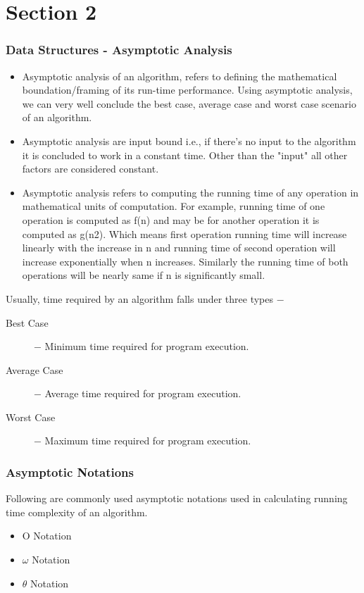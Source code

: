 \documentclass{beamer}
\begin{document}
\section{Section 2}
\begin{frame}
\frametitle{Data Structures - Asymptotic Analysis}
 
 \begin{itemize}
\item Asymptotic analysis of an algorithm, refers to defining the mathematical boundation/framing of its run-time performance. Using asymptotic analysis, we can very well conclude the best case, average case and worst case scenario of an algorithm.
\item 
Asymptotic analysis are input bound i.e., if there's no input to the algorithm it is concluded to work in a constant time. Other than the "input" all other factors are considered constant.
\item 
Asymptotic analysis refers to computing the running time of any operation in mathematical units of computation. For example, running time of one operation is computed as f(n) and may be for another operation it is computed as g(n2). Which means first operation running time will increase linearly with the increase in n and running time of second operation will increase exponentially when n increases. Similarly the running time of both operations will be nearly same if n is significantly small.
\end{itemize}
\end{frame}
\begin{frame}

Usually, time required by an algorithm falls under three types −
\begin{description}
\item[Best Case] − Minimum time required for program execution.

\item[Average Case] − Average time required for program execution.

\item[Worst Case] − Maximum time required for program execution.
\end{description}
\end{frame}
\begin{frame}
\frametitle{Asymptotic Notations}
Following are commonly used asymptotic notations used in calculating running time complexity of an algorithm.

\begin{itemize}
\item Ο Notation
\item $\omega$ Notation
\item $\theta$ Notation
\end{itemize}
\end{frame}
\end{document}
